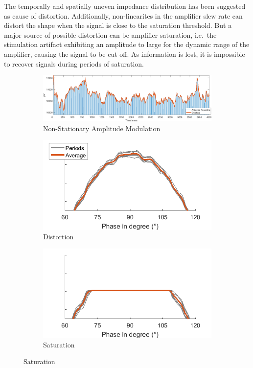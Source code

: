 \documentclass[a4paper]{article}
\begin{document}
The temporally and spatially uneven impedance distribution has been suggested as cause of distortion.
Additionally, non-linearites in the amplifier slew rate can distort the shape when the signal is close to the saturation threshold.
But a major source of possible distortion can be  amplifier saturation, i.e.\ the stimulation artifact exhibiting an amplitude to large for the dynamic range of the amplifier, causing the signal to be cut off. As information is lost, it is impossible to recover signals during periods of saturation.

\begin{figure}[hbtp]
    \begin{subfigure}{1\textwidth}
    \includegraphics[width=\textwidth]{./img/intro/nonstationarity.png}
    \caption{Non-Stationary Amplitude Modulation}\label{fig:nonstationary}
    \end{subfigure}

    \begin{subfigure}{.5\textwidth}
    \includegraphics[width=\textwidth]{./img/intro/distortion.png}
    \caption{Distortion}\label{fig:distortion}
    \end{subfigure}
    \begin{subfigure}{.5\textwidth}
    \includegraphics[width=\textwidth]{./img/intro/saturation.png}
    \caption{Saturation}\label{fig:saturation}
    \end{subfigure}


\end{figure}
\end{document}
